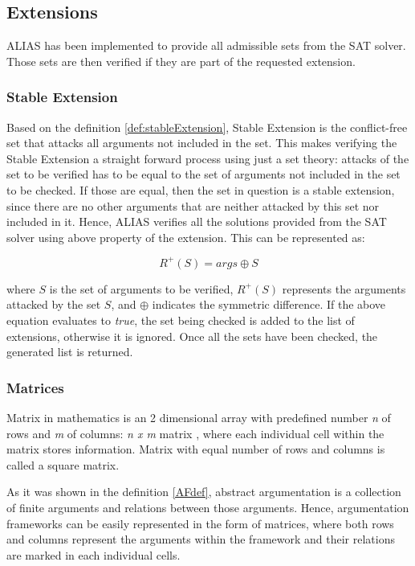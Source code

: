 \subsection{Extensions}
ALIAS has been implemented to provide all admissible sets from the SAT solver. Those sets are then verified if they are part of the requested extension. 


\subsubsection{Stable Extension} \label{section:stableExtension}
Based on the definition \ref{def:stableExtension}, Stable Extension is the conflict-free set that attacks all arguments not included in the set. This makes verifying the Stable Extension a straight forward process using just a set theory: attacks of the set to be verified has to be equal to the set of arguments not included in the set to be checked. If those are equal, then the set in question is a stable extension, since there are no other arguments that are neither attacked by this set nor included in it. Hence, ALIAS verifies all the solutions provided from the SAT solver using above property of the extension. This can be represented as: 

\begin{equation}
R^+(S) = args \oplus S
\end{equation}

where $S$ is the set of arguments to be verified, $R^+(S)$ represents the arguments attacked by the set $S$, and $\oplus$ indicates the symmetric difference. If the above equation evaluates to \textit{true}, the set being checked is added to the list of extensions, otherwise it is ignored. Once all the sets have been checked, the generated list is returned.

\subsubsection{Matrices}
Matrix in mathematics is an 2 dimensional array with predefined number \textit{n} of rows and \textit{m} of columns: \textit{n x m} matrix \citep{matrices}, where each individual cell within the matrix stores information. Matrix with equal number of rows and columns is called a square matrix. 

As it was shown in the definition \ref{AFdef}, abstract argumentation is a collection of finite arguments and relations between those arguments. Hence, argumentation frameworks can be easily represented in the form of matrices, where both rows and columns represent the arguments within the framework and their relations are marked in each individual cells. 

